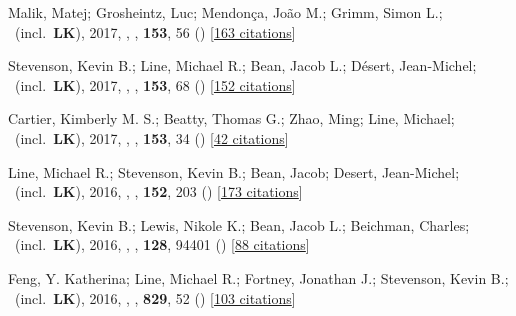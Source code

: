 \item[{\color{numcolor}\scriptsize13}] Malik, Matej; Grosheintz, Luc; Mendon{\c{c}}a, Jo{\~a}o M.; Grimm, Simon L.; \etal\ (incl.\ \textbf{LK}), 2017, , \aj, \textbf{153}, 56 () [\href{https://ui.adsabs.harvard.edu/abs/2017AJ....153...56M}{163 citations}]

\item[{\color{numcolor}\scriptsize12}] Stevenson, Kevin B.; Line, Michael R.; Bean, Jacob L.; D{\'e}sert, Jean-Michel; \etal\ (incl.\ \textbf{LK}), 2017, , \aj, \textbf{153}, 68 () [\href{https://ui.adsabs.harvard.edu/abs/2017AJ....153...68S}{152 citations}]

\item[{\color{numcolor}\scriptsize11}] Cartier, Kimberly M. S.; Beatty, Thomas G.; Zhao, Ming; Line, Michael; \etal\ (incl.\ \textbf{LK}), 2017, , \aj, \textbf{153}, 34 () [\href{https://ui.adsabs.harvard.edu/abs/2017AJ....153...34C}{42 citations}]

\item[{\color{numcolor}\scriptsize10}] Line, Michael R.; Stevenson, Kevin B.; Bean, Jacob; Desert, Jean-Michel; \etal\ (incl.\ \textbf{LK}), 2016, , \aj, \textbf{152}, 203 () [\href{https://ui.adsabs.harvard.edu/abs/2016AJ....152..203L}{173 citations}]

\item[{\color{numcolor}\scriptsize9}] Stevenson, Kevin B.; Lewis, Nikole K.; Bean, Jacob L.; Beichman, Charles; \etal\ (incl.\ \textbf{LK}), 2016, , \pasp, \textbf{128}, 94401 () [\href{https://ui.adsabs.harvard.edu/abs/2016PASP..128i4401S}{88 citations}]

\item[{\color{numcolor}\scriptsize8}] Feng, Y. Katherina; Line, Michael R.; Fortney, Jonathan J.; Stevenson, Kevin B.; \etal\ (incl.\ \textbf{LK}), 2016, , \apj, \textbf{829}, 52 () [\href{https://ui.adsabs.harvard.edu/abs/2016ApJ...829...52F}{103 citations}]

